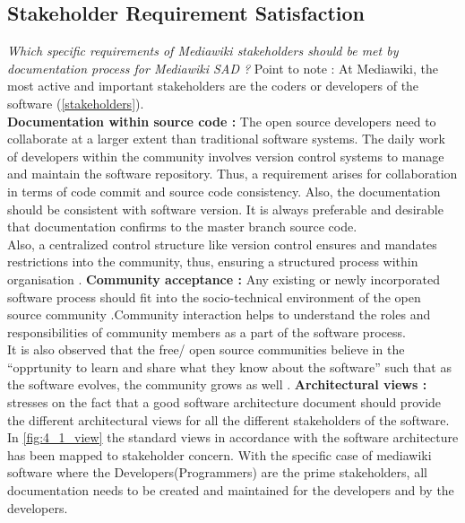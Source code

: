 \subsection{Stakeholder Requirement Satisfaction}
\indent \emph {Which specific requirements of Mediawiki stakeholders should be met by documentation process for Mediawiki SAD ?}
\newline
Point to note : At Mediawiki, the most active and important stakeholders are the coders or developers of the software (\autoref{stakeholders}).
\newline
\\\indent \textbf{Documentation within source code : }  The open source developers need to collaborate at a larger extent than traditional software systems. The daily work of developers within the community involves version control systems to manage and maintain the software repository. Thus, a requirement arises for collaboration in terms of code commit and source code consistency. Also, the documentation should be consistent with software version. It is always preferable  and desirable that documentation confirms to the master branch source code.
\\\indent Also, a centralized control structure like version control ensures and mandates restrictions into the community, thus, ensuring a structured process within organisation \cite{Wu2001}.
\newline
\indent \textbf{Community acceptance : }Any existing or newly incorporated software process should fit into the socio-technical environment of the open source community \cite{Mens2011}.Community interaction helps to understand the roles and responsibilities of community members as a part of the software process. 
\\\indent It is also observed that the free/ open source communities believe in the \enquote{opprtunity to learn and share what they know about the software} such that as the software evolves, the community grows as well \cite{Scacchi2006}.
\newline
\indent \textbf{Architectural views : }\cite{BachmannDocumentingSoftware2010} stresses on the fact that a good software architecture document should provide the different architectural views for all the different stakeholders of the software. In \autoref{fig:4_1_view} the standard views in accordance with the software architecture has been mapped to stakeholder concern. With the specific case of mediawiki software where the Developers(Programmers) are the prime stakeholders, all documentation needs to be created and maintained for the developers and by the developers. 
